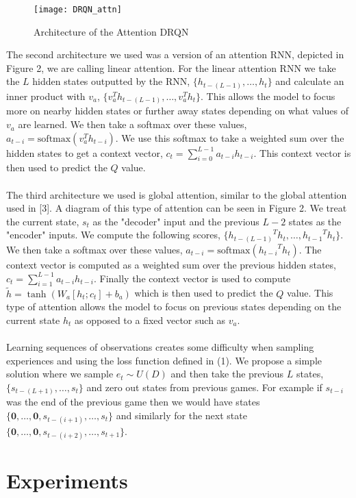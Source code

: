 \documentclass{article}
\begin{document}
\begin{figure}[h]
    \centering
    \texttt{[image: DRQN\_attn]}
    \caption{Architecture of the Attention DRQN}
\end{figure}

The second architecture we used was a version of an attention RNN, depicted in
Figure 2, we are calling linear attention. For the linear attention RNN we take
the $L$ hidden states outputted by the RNN, $\{h_{t-(L-1)}, \dots, h_{t}\}$ and
calculate an inner product with $v_a$, $\{v_a^Th_{t-(L-1)}, \dots, v_a^Th_{t}\}$.
This allows the model to focus more on nearby hidden states or further away states
depending on what values of $v_a$ are learned. We then take a softmax over these
values, $a_{t-i} = \text{softmax}(v_a^Th_{t-i})$. We use this softmax to take a weighted
sum over the hidden states to get a context vector,
$c_t = \sum_{i=0}^{L-1}a_{t-i}h_{t-i}$. This context vector is then used to predict
the $Q$ value. \\
\\
The third architecture we used is global attention, similar to the global attention
used in [3]. A diagram of this type of attention can be seen in Figure 2. We treat
the current state, $s_t$ as the "decoder" input and the previous $L - 2$ states as
the "encoder" inputs. We compute the following scores,
$\{{h_{t-(L-1)}}^Th_t, \dots, {h_{t-1}}^Th_t\}$. We then take a softmax over these
values, $a_{t-i} = \text{softmax}({h_{t-i}}^Th_t)$. The context vector is computed
as a weighted sum over the previous hidden states, $c_t = \sum_{i=1}^{L-1}a_{t-i}h_{t-i}$.
Finally the context vector is used to compute $\tilde{h} = \tanh(W_a[h_t;c_t] + b_a)$
which is then used to predict the $Q$ value. This type of attention allows the model
to focus on previous states depending on the current state $h_t$ as opposed to a
fixed vector such as $v_a$. \\
\\
Learning sequences of observations creates some difficulty when sampling
experiences and using the loss function defined in (1). We propose a simple
solution where we sample $e_t \sim U(D)$ and then take the previous $L$ states,
$\{s_{t-(L+1)}, \dots, s_t\}$ and zero out states from previous games. For example
if $s_{t-i}$ was the end of the previous game then we would have states
$\{\mathbf{0}, \dots, \mathbf{0}, s_{t-(i+1)}, \dots, s_t\}$ and similarly for the
next state $\{\mathbf{0}, \dots, \mathbf{0},s_{t-(i+2)}, \dots, s_{t+1}\}$.

\section{Experiments}
\end{document}
